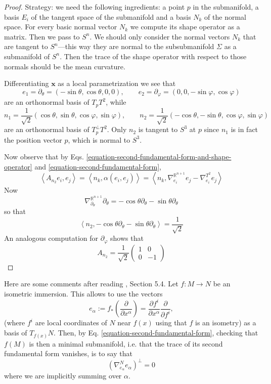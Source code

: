 \begin{proof}
Strategy: we need the following ingredients: a point $p$ in the submanifold, a
basis $E_i$ of the tangent space of the submanifold and a basis $N_k$ of the
normal space. For every basic normal vector $N_k$ we compute its shape operator
as a matrix. Then we pass to $S^n$. We should only consider the normal vectors
$N_k$ that are tangent to $S^n$---this way they are normal to the subsubmanifold
$\Sigma$ as a submanifold of $S^n$. Then the trace of the shape operator with
respect to those normals should be the mean curvature.

Differentiating $\mathbf{x}$ as a local parametrization we see that
$$
e_1=\partial_\theta=(-\sin\theta,\cos\theta,0,0),\qquad 
e_2=\partial_\varphi=(0,0,-\sin\varphi,\cos\varphi)
$$
are an orthonormal basis of $T_pT^2$, while
$$
n_1=\frac{1}{\sqrt{2}}(\cos\theta,\sin\theta,\cos\varphi,\sin\varphi),
\qquad n_2=\frac{1}{\sqrt{2}}(-\cos\theta,-\sin\theta,\cos\varphi,\sin\varphi)
$$
are an orthonormal basis of $T_p^\perp T^2$. Only $n_2$ is tangent to $S^3$ at 
$p$ since $n_1$ is in fact the position vector $p$, which is normal to $S^3$.

Now observe that by Eqs.
\ref{equation-second-fundamental-form-and-shape-operator} and
\ref{equation-second-fundamental-form},
$$
\left<A_{n_2}e_i,e_j\right>=\left<n_k,\alpha(e_i,e_j)\right>
=\left<n_k,\nabla^{\mathbb{R}^{n+1}}_{e_i}e_j
-\nabla^{T^2}_{e_i}e_j\right>
$$
Now
$$
\nabla^{\mathbb{R}^{n+1}}_{\partial_\theta}\partial_\theta=
-\cos\theta\partial_\theta-\sin\theta\partial_\theta
$$
so that
$$
\left<n_2,-\cos\theta\partial_\theta-\sin\theta\partial_\theta\right>
=\frac{1}{\sqrt{2}}
$$
An analogous computation for $\partial_\varphi$ shows that
$$
A_{n_2}=\frac{1}{\sqrt{2}}\begin{pmatrix}
1&0\\ 
0&-1
\end{pmatrix}
$$
\end{proof}

Here are some comments after reading \cite{Jost}, Section 5.4. Let $f:M\to N$ be
an isometric immersion. This allows to use the vectors
$$
e_\alpha:=f_*\left(\frac{\partial }{\partial x^\alpha}\right)=
\frac{\partial f^i}{\partial x^\alpha}\frac{\partial }{\partial f^i},
$$
(where $f^i$ are local coordinates of $N$ near $f(x)$ using that $f$ is an
isometry) as a basis of
$T_{f(x)}N$. Then, by Eq. \ref{equation-second-fundamental-form}, checking that
$f(M)$ is then a minimal submanifold, i.e. that the trace of its second
fundamental form vanishes, is to say that
\begin{equation}
\label{equation-isometric-immersion-basis}
(\nabla^{N}_{e_\alpha}e_\alpha)^\perp=0
\end{equation}
where we are implicitly summing over $\alpha$.


